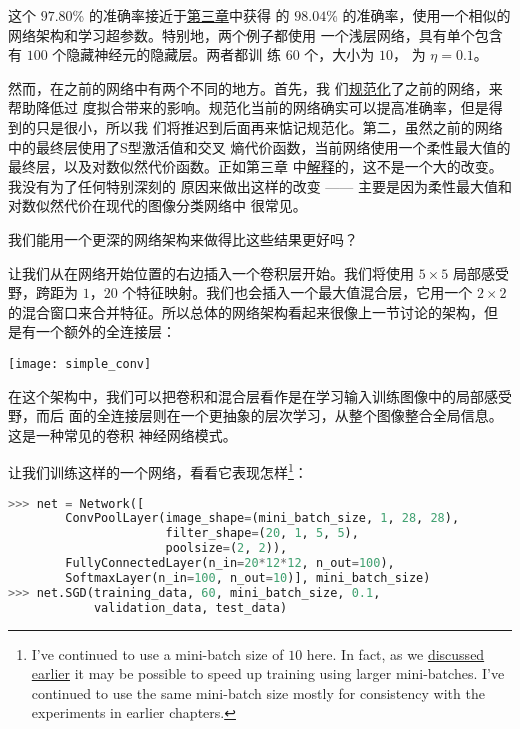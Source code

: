 这个 $97.80$\% 的准确率接近于\hyperref[chap3_98_04_percent]{第三章}中获得
的 $98.04$\% 的准确率，使用一个相似的网络架构和学习超参数。特别地，两个例子都使用
一个浅层网络，具有单个包含有 $100$ 个隐藏神经元的隐藏层。两者都训
练 $60$ 个\epochs{}，\minibatch{}大小为 $10$，\learningrate{} 为 $\eta = 0.1$。

然而，在之前的网络中有两个不同的地方。首先，我
们\hyperref[sec:overfitting_and_regularization]{规范化}了之前的网络，来帮助降低过
度拟合带来的影响。规范化当前的网络确实可以提高准确率，但是得到的只是很小，所以我
们将推迟到后面再来惦记规范化。第二，虽然之前的网络中的最终层使用了S型激活值和交叉
熵代价函数，当前网络使用一个柔性最大值的最终层，以及对数似然代价函数。正如第三章
中\hyperref[subsec:softmax]{解释}的，这不是一个大的改变。我没有为了任何特别深刻的
原因来做出这样的改变 —— 主要是因为柔性最大值和对数似然代价在现代的图像分类网络中
很常见。

我们能用一个更深的网络架构来做得比这些结果更好吗？

让我们从在网络开始位置的右边插入一个卷积层开始。我们将使用 $5 \times 5$ 局部感受
野，跨距为 $1$，$20$ 个特征映射。我们也会插入一个最大值混合层，它用一个 $2
\times 2$ 的混合窗口来合并特征。所以总体的网络架构看起来很像上一节讨论的架构，但
是有一个额外的全连接层：
\begin{center}
  \texttt{[image: simple\_conv]}  
\end{center}

在这个架构中，我们可以把卷积和混合层看作是在学习输入训练图像中的局部感受野，而后
面的全连接层则在一个更抽象的层次学习，从整个图像整合全局信息。这是一种常见的卷积
神经网络模式。

让我们训练这样的一个网络，看看它表现怎样\footnote{I've continued to use a
  mini-batch size of $10$ here. In fact, as we
  \hyperref[mini_batch_size]{discussed earlier} it may be possible to speed up
  training using larger mini-batches. I've continued to use the same mini-batch
  size mostly for consistency with the experiments in earlier chapters.}：

\begin{lstlisting}[language=Python]
>>> net = Network([
        ConvPoolLayer(image_shape=(mini_batch_size, 1, 28, 28), 
                      filter_shape=(20, 1, 5, 5), 
                      poolsize=(2, 2)),
        FullyConnectedLayer(n_in=20*12*12, n_out=100),
        SoftmaxLayer(n_in=100, n_out=10)], mini_batch_size)
>>> net.SGD(training_data, 60, mini_batch_size, 0.1, 
            validation_data, test_data)
\end{lstlisting}

